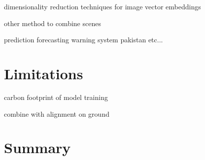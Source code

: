 \documentclass[12pt]{article}
\begin{document}
dimensionality reduction techniques for image vector embeddings

other method to combine scenes

prediction forecasting warning system pakistan etc...
\section{Limitations}

carbon footprint of model training

combine with alignment on ground 

\section{Summary}





\newpage



\end{document}
